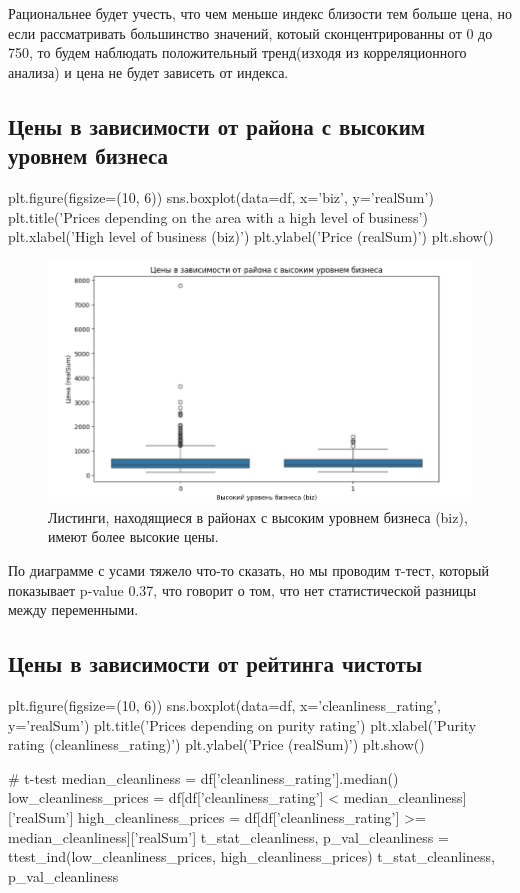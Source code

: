 \documentclass[
	11pt
] {article}
\begin{document}
	Рациональнее будет учесть, что чем меньше индекс близости тем больше цена, но если рассматривать большинство значений, котоый сконцентрированны от 0 до 750, то будем наблюдать положительный тренд(изходя из корреляционного анализа) и цена не будет зависеть от индекса.

\subsection{Цены в зависимости от района с высоким уровнем бизнеса}
\begin{python}
plt.figure(figsize=(10, 6))
sns.boxplot(data=df, x='biz', y='realSum')
plt.title('Prices depending on the area with a high level of business')
plt.xlabel('High level of business (biz)')
plt.ylabel('Price (realSum)')
plt.show()
\end{python}

	\begin{figure}[H]
		\centering
		\includegraphics[width=1.0\textwidth]{fig-08}
		\caption{Листинги, находящиеся в районах с высоким уровнем бизнеса (biz), имеют более высокие цены.}
	\end{figure}
	По диаграмме с усами тяжело что-то сказать, но мы проводим т-тест, который показывает p-value 0.37, что говорит о том, что нет статистической разницы между переменными.

\subsection{Цены в зависимости от рейтинга чистоты}
\begin{python}
plt.figure(figsize=(10, 6))
sns.boxplot(data=df, x='cleanliness_rating', y='realSum')
plt.title('Prices depending on purity rating')
plt.xlabel('Purity rating (cleanliness_rating)')
plt.ylabel('Price (realSum)')
plt.show()

# t-test
median_cleanliness = df['cleanliness_rating'].median()
low_cleanliness_prices = df[df['cleanliness_rating'] < median_cleanliness]['realSum']
high_cleanliness_prices = df[df['cleanliness_rating'] >= median_cleanliness]['realSum']
t_stat_cleanliness, p_val_cleanliness = ttest_ind(low_cleanliness_prices, high_cleanliness_prices)
t_stat_cleanliness, p_val_cleanliness

\end{python}
\end{document}
